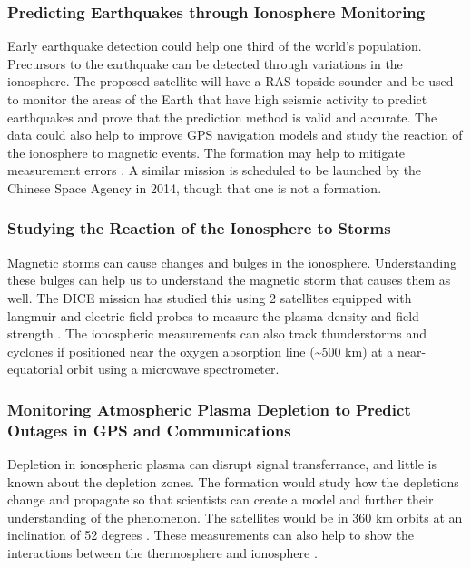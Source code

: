 \subsubsection{Predicting Earthquakes through Ionosphere Monitoring}
\label{predicting_earthquakes}
Early earthquake detection could help one third of the world's population. Precursors to the earthquake can be detected through variations in the ionosphere. The proposed satellite will have a RAS topside sounder and be used to monitor the areas of the Earth that have high seismic activity to predict earthquakes and prove that the prediction method is valid and accurate. The data could also help to improve GPS navigation models and study the reaction of the ionosphere to magnetic events. The formation may help to mitigate measurement errors \cite{Ref:Jason}. A similar mission is scheduled to be launched by the Chinese Space Agency in 2014, though that one is not a formation\cite{Ref:Earthquake}. 


\subsubsection{Studying the Reaction of the Ionosphere to Storms }
\label{iono_storm_reaction}
Magnetic storms can cause changes and bulges in the ionosphere. Understanding these bulges can help us to understand the magnetic storm that causes them as well. The DICE mission has studied this using 2 satellites equipped with langmuir and electric field probes to measure the plasma density and field strength \cite{Ref:Crowley,Ref:Fish}. The ionospheric measurements can also track thunderstorms and cyclones if positioned near the oxygen absorption line (\textasciitilde{}500 km) at a near-equatorial orbit using a microwave spectrometer. \cite{Ref:Blackwell}


\subsubsection{Monitoring Atmospheric Plasma Depletion to Predict Outages in GPS and Communications}
\label{atm_plasma}
Depletion in ionospheric plasma can disrupt signal transferrance, and little is known about the depletion zones. The formation would study how the depletions change and propagate so that scientists can create a model and further their understanding of the phenomenon. The satellites would be in 360 km orbits at an inclination of 52 degrees \cite{Ref:Krause}\cite{Ref:Bracikowski}. These measurements can also help to show the interactions between the thermosphere and ionosphere \cite{Ref:Blalthazor}.

